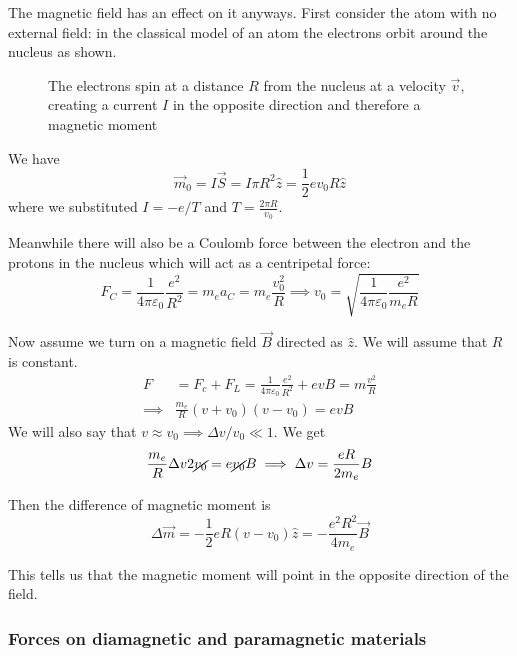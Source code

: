 \documentclass[12pt]{extarticle}
\begin{document}
The magnetic field has an effect on it anyways.
First consider the atom with no external field: in the classical model of an atom the electrons orbit around the nucleus
as shown.

\begin{figure}[H]
    \centering
    
    \caption{The electrons spin at a distance $R$ from the nucleus at a velocity $\vec v$,
        creating a current $I$ in the opposite direction and therefore a magnetic moment}
\end{figure}

We have
\begin{equation}
    \vec m_0 = I \vec S = I \pi R^2 \hat z = \frac{1}{2}e v_0 R \hat z
\end{equation}
where we substituted $I = -e/T$ and $T = \frac{2\pi R}{v_0}$.

Meanwhile there will also be a Coulomb force between the electron and the protons in the nucleus
which will act as a centripetal force:
\begin{equation}
    F_C = \frac{1}{4 \pi \varepsilon_0} \frac{e^2}{R^2} = m_e a_C = m_e \frac{v_0^2}{R}
    \implies v_0 = \sqrt{\frac{1}{4 \pi \varepsilon_0} \frac{e^2}{m_e R}}
\end{equation}

Now assume we turn on a magnetic field $\vec B$ directed as $\hat z$.
We will assume that $R$ is constant.
\begin{align}
    F        & = F_c + F_L = \frac{1}{4 \pi \varepsilon_0} \frac{e^2}{R^2} + e v B = m \frac{v^2}{R} \\
    \implies & \frac{m_e}{R} (v+v_0)(v- v_0) = evB
\end{align}
We will also say that $v \approx v_0 \implies \Delta v/v_0 \ll 1$.
We get
\begin{equation}
    \frac{m_e}{R}\Delta v 2 \cancel{v_0} = e \cancel{v_0} B \implies \Delta v = \frac{e R}{2m_e}B
\end{equation}

Then the difference of magnetic moment is
\begin{equation}
    \Delta \vec m = -\frac{1}{2} e R (v-v_0) \hat z = -\frac{e^2R^2}{4 m_e} \vec B
\end{equation}

This tells us that the magnetic moment will point in the opposite direction of the field.

\subsubsection{Forces on diamagnetic and paramagnetic materials}
\end{document}
